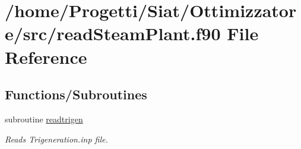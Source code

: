 \hypertarget{read_steam_plant_8f90}{\section{/home/\-Progetti/\-Siat/\-Ottimizzatore/src/read\-Steam\-Plant.f90 File Reference}
\label{read_steam_plant_8f90}
}
\subsection*{Functions/\-Subroutines}
\begin{DoxyCompactItemize}
\item 
subroutine \hyperlink{read_steam_plant_8f90_a2048dd756a11560009d65015dc03f317}{readtrigen}
\begin{DoxyCompactList}\small\item\em Reads Trigeneration.\-inp file. \end{DoxyCompactList}\end{DoxyCompactItemize}


